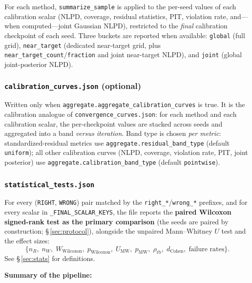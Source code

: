 \documentclass[11pt]{article}
\newcommand{\RIGHT}{\texttt{RIGHT}}
\newcommand{\WRONG}{\texttt{WRONG}}
\begin{document}
For each method, \texttt{summarize\_sample} is applied to the per-seed values of each
calibration scalar (NLPD, coverage, residual statistics, PIT, violation rate,
and---when computed---joint Gaussian NLPD), restricted to the \emph{final}
calibration checkpoint of each seed. Three buckets are reported when available:
\texttt{global} (full grid), \texttt{near\_target} (dedicated near-target grid,
plus \texttt{near\_target\_count}/\texttt{fraction} and joint near-target NLPD),
and \texttt{joint} (global joint-posterior NLPD).

\subsubsection{\texttt{calibration\_curves.json} (optional)}

Written only when \texttt{aggregate.aggregate\_calibration\_curves} is true.
It is the calibration analogue of \texttt{convergence\_curves.json}: for each
method and each calibration scalar, the per-checkpoint values are stacked across
seeds and aggregated into a band \emph{versus iteration}. Band type is chosen
\emph{per metric}: standardized-residual metrics use
\texttt{aggregate.residual\_band\_type} (default \texttt{uniform}); all other
calibration curves (NLPD, coverage, violation rate, PIT, joint posterior) use
\texttt{aggregate.calibration\_band\_type} (default \texttt{pointwise}).

\subsubsection{\texttt{statistical\_tests.json}}

For every (\RIGHT, \WRONG) pair matched by the \texttt{right\_*}/\texttt{wrong\_*}
prefixes, and for every scalar in \texttt{\_FINAL\_SCALAR\_KEYS}, the file reports
the \textbf{paired Wilcoxon signed-rank test as the primary comparison} (the
seeds are paired by construction; \S\,\ref{sec:protocol}), alongside the
unpaired Mann--Whitney $U$ test and the effect sizes:
\[
  \bigl\{
    n_R,\;n_W,\;
    W_{\mathrm{Wilcoxon}},\;p_{\mathrm{Wilcoxon}},\;
    U_{\mathrm{MW}},\;p_{\mathrm{MW}},\;
    \rho_{\mathrm{rb}},\;
    d_{\mathrm{Cohen}},\;
    \text{failure rates}
  \bigr\}.
\]
See \S\,\ref{sec:stats} for definitions.
 
\medskip
\textbf{Summary of the pipeline:}
 
\end{document}
